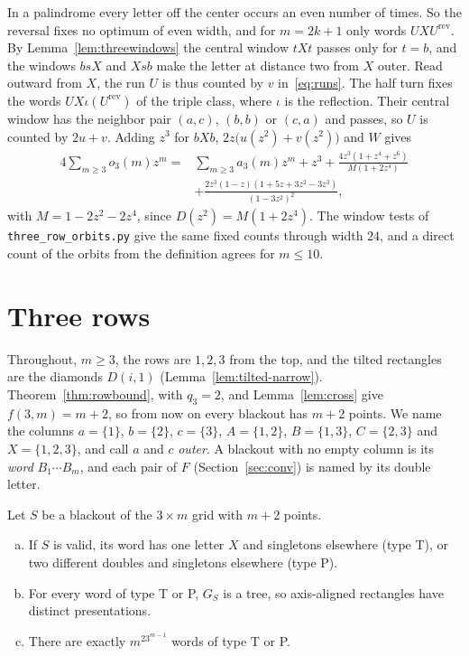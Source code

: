 \begin{remark}
In a palindrome every letter off the center occurs an even number of times. So the reversal
fixes no optimum of even width, and for $m=2k+1$ only words $UXU^{\mathrm{rev}}$. By Lemma~\ref{lem:threewindows} the central window $tXt$ passes only for $t=b$, and the
windows $bsX$ and $Xsb$ make the letter at distance two from $X$ outer. Read outward from
$X$, the run $U$ is thus counted by $v$ in~\eqref{eq:runs}. The half turn fixes the words
$UX\iota(U^{\mathrm{rev}})$ of the triple class, where $\iota$ is the reflection. Their
central window has the neighbor pair $(a,c)$, $(b,b)$ or $(c,a)$ and passes, so $U$ is
counted by $2u+v$. Adding $z^3$ for $bXb$, $2z\bigl(u(z^2)+v(z^2)\bigr)$ and $W$ gives
\begin{align*}
4\sum_{m\ge3}o_3(m)z^m={}&\sum_{m\ge3}a_3(m)z^m+z^3+\frac{4z^3(1+z^4+z^6)}{M(1+2z^4)}\\
&+\frac{2z^3(1-z)(1+5z+3z^2-3z^3)}{(1-3z^2)^2},
\end{align*}
with $M=1-2z^2-2z^4$, since $D(z^2)=M(1+2z^4)$. The window tests of
\nolinkurl{three_row_orbits.py} give the same fixed counts through width $24$, and a direct
count of the orbits from the definition agrees for $m\le10$.
\end{remark}

\section{Three rows}\label{sec:three}

Throughout, $m\ge3$, the rows are $1,2,3$ from the top, and the tilted rectangles are the
diamonds $D(i,1)$ (Lemma~\ref{lem:tilted-narrow}).
Theorem~\ref{thm:rowbound}, with $q_3=2$, and Lemma~\ref{lem:cross} give $f(3,m)=m+2$, so from
now on every blackout has $m+2$ points. We name the columns $a=\{1\}$, $b=\{2\}$, $c=\{3\}$,
$A=\{1,2\}$, $B=\{1,3\}$, $C=\{2,3\}$ and $X=\{1,2,3\}$, and call $a$ and $c$ \emph{outer}. A
blackout with no empty column is its \emph{word} $B_1\cdots B_m$, and each pair of $F$
(Section~\ref{sec:conv}) is named by its double letter.

\begin{proposition}\label{prop:threeclass}
Let $S$ be a blackout of the $3\times m$ grid with $m+2$ points.
\begin{enumerate}[(a)]
\item If $S$ is valid, its word has one letter $X$ and singletons elsewhere (type T), or two
different doubles and singletons elsewhere (type P).
\item For every word of type T or P, $G_S$ is a tree, so axis-aligned rectangles have
distinct presentations.
\item There are exactly $m^23^{m-1}$ words of type T or P.
\end{enumerate}
\end{proposition}

